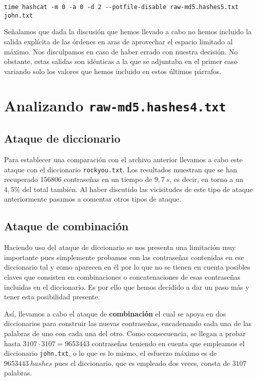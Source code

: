 \documentclass{article}
\begin{document}
            \begin{verbatim}
time hashcat -m 0 -a 0 -d 2 --potfile-disable raw-md5.hashes5.txt john.txt
            \end{verbatim}

            Señalamos que dada la discusión que hemos llevado a cabo no hemos incluido la salida explícita de las órdenes en aras de aprovechar el espacio limitado al máximo. Nos disculpamos en caso de haber errado con nuestra decisión. No obstante, estas salidas son idénticas a la que se adjuntaba en el primer caso variando solo los valores que hemos incluido en estos últimos párrafos.

    \section{Analizando \texttt{raw-md5.hashes4.txt}}
        \subsection{Ataque de diccionario}
            Para establecer una comparación con el archivo anterior llevamos a cabo este ataque con el diccionario \texttt{rockyou.txt}. Los resultados muestran que se han recuperado $156806$ contraseñas en un tiempo de $9,7\ s$, es decir, en torno a un $4,5\%$ del total también. Al haber discutido las vicisitudes de este tipo de ataque anteriormente pasamos a comentar otros tipos de ataque.

        \subsection{Ataque de combinación}
            Haciendo uso del ataque de diccionario se nos presenta una limitación muy importante pues simplemente probamos con las contraseñas contenidas en ese diccionario tal y como aparecen en él por lo que no se tienen en cuenta posibles claves que consisten en combinaciones o concatenaciones de esas contraseñas incluidas en el diccionario. Es por ello que hemos decidido a dar un paso más y tener esta posibilidad presente.

            Así, llevamos a cabo el ataque de \textbf{combinación} el cual se apoya en dos diccionarios para construir las nuevas contraseñas, encadenando cada una de las palabras de uno con cada una del otro. Como consecuencia, se llegan a probar hasta $3107 \cdot 3107 = 9653443$ contraseñas teniendo en cuenta que empleamos el diccionario \texttt{john.txt}, o lo que es lo mismo, el esfuerzo máximo es de $9653443\ hashes$ pues el diccionario, que es empleado dos veces, consta de $3107$ palabras.
\end{document}
